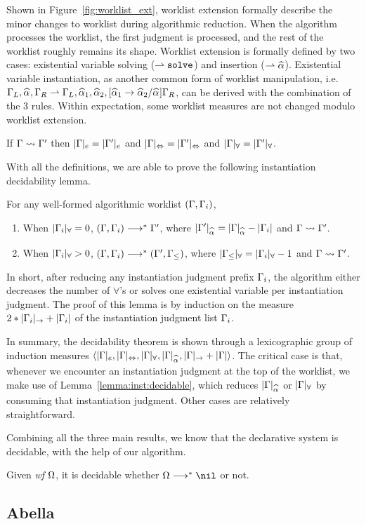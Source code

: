 Shown in Figure~\ref{fig:worklist_ext},
worklist extension formally describe the minor changes to worklist during algorithmic reduction.
When the algorithm processes the worklist, the first judgment is processed,
and the rest of the worklist roughly remains its shape.
Worklist extension is formally defined by two cases:
existential variable solving ($\mathtt{\rightharpoonup solve}$) and insertion ($\mathtt{\jExt \al}$).
Existential variable instantiation, as another common form of worklist manipulation,
i.e. $\Gm_L,\al,\Gm_R \jExt \Gm_L, \al[1], \al[2], [\al[1] \to \al[2] / \al]\Gm_R$,
can be derived with the combination of the 3 rules.
Within expectation, some worklist measures are not changed modulo worklist extension.

\newcommand{\equivGm}[1]{|\Gm|_{#1} = |\Gm'|_{#1}}
\begin{lemma}
If $\Gamma\rightsquigarrow\Gamma'$ then $\equivGm{e}$ and $\equivGm\Leftrightarrow$ and $\equivGm\forall$.
\end{lemma}

With all the definitions, we are able to prove the following instantiation decidability lemma.

\begin{lemma}\label{lemma:inst:decidable}
For any well-formed algorithmic worklist $(\Gamma, \Gamma_i)$,
\begin{enumerate}[1)]
    \item When $|\Gamma_i|_\forall = 0$, $(\Gamma, \Gamma_i) \longrightarrow^* \Gamma'$,
        where $|\Gm'|_{\al} = |\Gm|_{\al} - |\Gm_i|$ and $\Gamma\rightsquigarrow\Gamma'$.
    \item When $|\Gamma_i|_\forall > 0$, $(\Gamma, \Gamma_i) \longrightarrow^* (\Gamma', \Gamma_\le)$,
        where $|\Gamma_\le|_\forall = |\Gamma_i|_\forall - 1$ and $\Gamma\rightsquigarrow\Gamma'$.
\end{enumerate}
\end{lemma}

In short, after reducing any instantiation judgment prefix $\Gamma_i$,
the algorithm either decreases the number of $\forall$'s
or solves one existential variable per instantiation judgment.
The proof of this lemma is by induction on the measure $2*|\Gamma_i|_\to + |\Gamma_i|$
of the instantiation judgment list $\Gamma_i$.

In summary, the decidability theorem is shown through a lexicographic group of induction measures
$\langle |\Gm|_e, |\Gm|_\Leftrightarrow, |\Gm|_\forall, |\Gm|_{\al}, |\Gm|_\to + |\Gm| \rangle$.
The critical case is that, whenever we encounter an instantiation judgment at the top of the worklist,
we make use of Lemma~\ref{lemma:inst:decidable}, which reduces $|\Gm|_{\al}$ or $|\Gamma|_\forall$
by consuming that instantiation judgment. Other cases are relatively straightforward.

Combining all the three main results, we know that the declarative system is decidable,
with the help of our algorithm.
\begin{corollary}
Given \emph{wf }$\Omega$, it is decidable whether $\Om\redto\nil$ or not.
\end{corollary}
\subsection{Abella}

